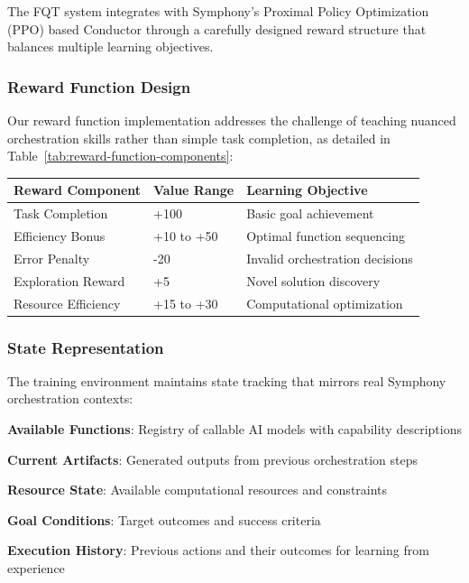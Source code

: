 The FQT system integrates with Symphony's Proximal Policy Optimization (PPO) based Conductor through a carefully designed reward structure that balances multiple learning objectives.

\subsubsection*{Reward Function Design}

Our reward function implementation addresses the challenge of teaching nuanced orchestration skills rather than simple task completion, as detailed in Table~\ref{tab:reward-function-components}:

\begin{center}
\begin{tabular}{@{}lll@{}}
\toprule
\textbf{Reward Component} & \textbf{Value Range} & \textbf{Learning Objective} \\
\midrule
Task Completion & +100 & Basic goal achievement \\
Efficiency Bonus & +10 to +50 & Optimal function sequencing \\
Error Penalty & -20 & Invalid orchestration decisions \\
Exploration Reward & +5 & Novel solution discovery \\
Resource Efficiency & +15 to +30 & Computational optimization \\
\bottomrule
\end{tabular}
\label{tab:reward-function-components}
\end{center}

\subsubsection*{State Representation}

The training environment maintains state tracking that mirrors real Symphony orchestration contexts:

\begin{compactlist}
    \item \textbf{Available Functions}: Registry of callable AI models with capability descriptions
    \item \textbf{Current Artifacts}: Generated outputs from previous orchestration steps
    \item \textbf{Resource State}: Available computational resources and constraints
    \item \textbf{Goal Conditions}: Target outcomes and success criteria
    \item \textbf{Execution History}: Previous actions and their outcomes for learning from experience
\end{compactlist}

